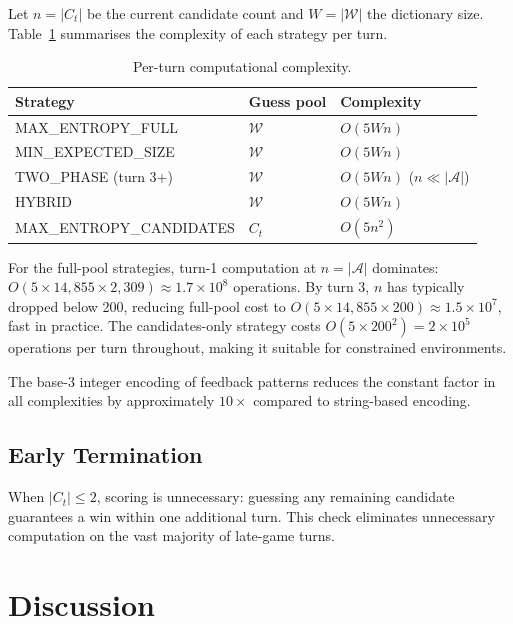 \documentclass{article}
\begin{document}
Let $n = |C_t|$ be the current candidate count and $W = |\mathcal{W}|$ the
dictionary size. Table~\ref{tab:complexity} summarises the complexity of each
strategy per turn.

\begin{table}[h]
  \centering
  \caption{Per-turn computational complexity.}
  \label{tab:complexity}
  \begin{tabular}{lll}
    \toprule
    Strategy & Guess pool & Complexity \\
    \midrule
    MAX\_ENTROPY\_FULL     & $\mathcal{W}$ & $O(5Wn)$ \\
    MIN\_EXPECTED\_SIZE    & $\mathcal{W}$ & $O(5Wn)$ \\
    TWO\_PHASE (turn 3+)   & $\mathcal{W}$ & $O(5Wn)$ ($n \ll |\mathcal{A}|$) \\
    HYBRID                 & $\mathcal{W}$ & $O(5Wn)$ \\
    MAX\_ENTROPY\_CANDIDATES & $C_t$       & $O(5n^2)$ \\
    \bottomrule
  \end{tabular}
\end{table}

For the full-pool strategies, turn-1 computation at $n = |\mathcal{A}|$ dominates:
$O(5 \times 14{,}855 \times 2{,}309) \approx 1.7 \times 10^8$ operations.
By turn 3, $n$ has typically dropped below 200, reducing full-pool cost to
$O(5 \times 14{,}855 \times 200) \approx 1.5 \times 10^7$, fast in practice.
The candidates-only strategy costs $O(5 \times 200^2) = 2 \times 10^5$
operations per turn throughout, making it suitable for constrained environments.

The base-3 integer encoding of feedback patterns reduces the constant factor in
all complexities by approximately $10\times$ compared to string-based encoding.

\subsection{Early Termination}

When $|C_t| \leq 2$, scoring is unnecessary: guessing any remaining candidate
guarantees a win within one additional turn. This check eliminates unnecessary
computation on the vast majority of late-game turns.

\section{Discussion}
\end{document}
